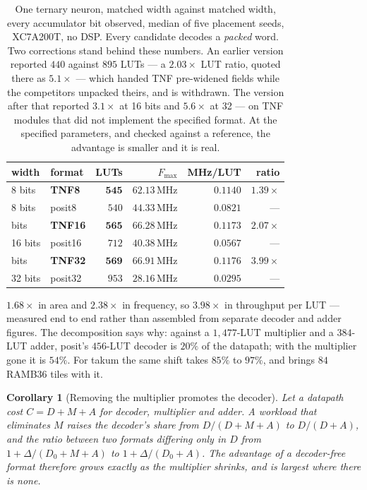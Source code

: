 \documentclass[11pt]{article}
\newtheorem{corollary}{Corollary}
\theoremstyle{definition}
\begin{document}
\begin{table}[t]\centering
\caption{One ternary neuron, matched width against matched width, every
accumulator bit observed, median of five placement seeds, XC7A200T, no DSP.
Every candidate decodes a \emph{packed} word. Two corrections stand behind these
numbers. An earlier version reported $440$ against $895$ LUTs --- a $2.03\times$
LUT ratio, quoted there as $5.1\times$ --- which handed TNF pre-widened fields while the competitors unpacked
theirs, and is withdrawn. The version after that reported $3.1\times$ at 16 bits
and $5.6\times$ at 32 --- on TNF modules that did not implement the specified
format. At the specified parameters, and checked against a reference, the
advantage is smaller and it is real.}
\label{tab:tnet}
\begin{tabular}{llrrrr}
\toprule
width & format & LUTs & $F_{\max}$ & MHz/LUT & ratio \\
\midrule
8 bits & \textbf{TNF8} & $\mathbf{545}$ & $62.13$\,MHz & $\mathbf{0.1140}$ & $\mathbf{1.39\times}$ \\
8 bits & posit8 & $540$ & $44.33$\,MHz & $0.0821$ & --- \\
\addlinespace
16 bits & \textbf{TNF16} & $\mathbf{565}$ & $66.28$\,MHz & $\mathbf{0.1173}$ & $\mathbf{2.07\times}$ \\
16 bits & posit16 & $712$ & $40.38$\,MHz & $0.0567$ & --- \\
\addlinespace
32 bits & \textbf{TNF32} & $\mathbf{569}$ & $66.91$\,MHz & $\mathbf{0.1176}$ & $\mathbf{3.99\times}$ \\
32 bits & posit32 & $953$ & $28.16$\,MHz & $0.0295$ & --- \\
\bottomrule
\end{tabular}
\end{table}

$1.68\times$ in area and $2.38\times$ in frequency, so $3.98\times$ in throughput
per LUT --- measured end to end rather than assembled from separate decoder and
adder figures. The decomposition says why: against a $1{,}477$-LUT multiplier and
a $384$-LUT adder, posit's $456$-LUT decoder is $20\%$ of the datapath; with the
multiplier gone it is $54\%$. For takum the same shift takes $85\%$ to $97\%$, and
brings $84$ RAMB36 tiles with it.

\begin{corollary}[Removing the multiplier promotes the decoder]
\label{cor:promote}
Let a datapath cost $C = D + M + A$ for decoder, multiplier and adder. A workload
that eliminates $M$ raises the decoder's share from $D/(D{+}M{+}A)$ to
$D/(D{+}A)$, and the ratio between two formats differing only in $D$ from
$1 + \Delta/(D_0{+}M{+}A)$ to $1 + \Delta/(D_0{+}A)$. The advantage of a
decoder-free format therefore grows exactly as the multiplier shrinks, and is
largest where there is none.
\end{corollary}
\end{document}
